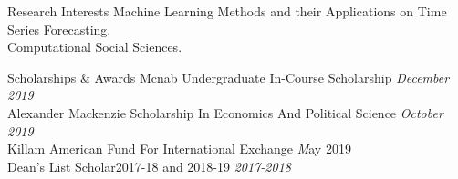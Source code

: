 \documentclass{resume} %
\begin{document}
\begin{rSection}{Research Interests}
Machine Learning Methods and their Applications on Time Series Forecasting.
\\Computational Social Sciences.
\end{rSection}


\begin{rSection}{Scholarships \& Awards}
{Mcnab Undergraduate In-Course Scholarship} \hfill {\em December 2019} \\
{Alexander Mackenzie Scholarship In Economics And Political Science} \hfill {\em October 2019} \\
{Killam American Fund For International Exchange} \hfill{\emph May 2019} \\
{Dean's List Scholar2017-18 and 2018-19} \hfill {\em 2017-2018}
\end{rSection}
\end{document}
